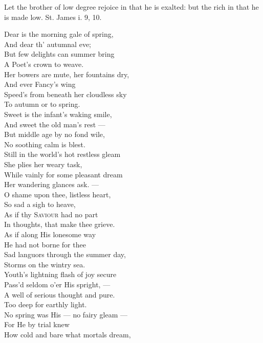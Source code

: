 
Let the brother of low degree rejoice in that he is exalted: but the rich in that he is made low. St. James i. 9, 10.

Dear is the morning gale of spring, \\
 And dear th’ autumnal eve; \\
 But few delights can summer bring \\
 A Poet’s crown to weave. \\
  Her bowers are mute, her fountains dry, \\
 And ever Fancy’s wing \\
 Speed’s from beneath her cloudless sky \\
 To autumn or to spring. \\
  Sweet is the infant’s waking smile, \\
 And sweet the old man’s rest — \\
 But middle age by no fond wile, \\
 No soothing calm is blest. \\
  Still in the world’s hot restless gleam \\
 She plies her weary task, \\
 While vainly for some pleasant dream \\
 Her wandering glances ask. — \\
  O shame upon thee, listless heart, \\
 So sad a sigh to heave, \\
 As if thy \textsc{Saviour} had no part \\
 In thoughts, that make thee grieve. \\
  As if along His lonesome way \\
 He had not borne for thee \\
 Sad languors through the summer day, \\
 Storms on the wintry sea. \\
  Youth’s lightning flash of joy secure \\
 Pass’d seldom o’er His spright, — \\
 A well of serious thought and pure. \\
 Too deep for earthly light. \\
  No spring was His — no fairy gleam — \\
 For He by trial knew \\
 How cold and bare what mortals dream, \\
